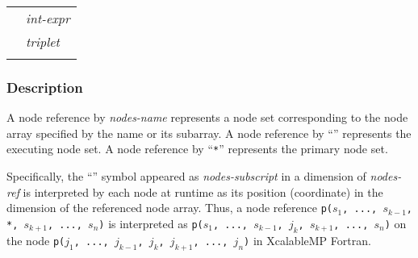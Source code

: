 \hspace{\hsize}

\begin{tabular}{ll}
 \hspace{0.5cm} & {\it int-expr} \\
 \hspace{0.5cm} & {\it triplet} \\
 \hspace{0.5cm} & {\tt *} \\
\end{tabular}


\subsubsection*{Description}


A node reference by {\it nodes-name} represents a node set corresponding
to the node array specified by the name or its subarray.
%
A node reference by ``{\tt *}''
represents the executing node set. A node reference by ``{\tt **}''
represents the primary node set.


Specifically, the ``{\tt *}'' symbol appeared as {\it nodes-subscript}
in a dimension of {\it nodes-ref} is interpreted by each node at runtime
as its position (coordinate) in the dimension of the referenced node
array.
%
Thus, a node reference {\tt p($s_1$, ..., $s_{k-1}$, *, $s_{k+1}$, ...,
$s_n$)} is interpreted as {\tt p($s_1$, ..., $s_{k-1}$, $j_k$,
$s_{k+1}$, ..., $s_n$)} on the node {\tt p($j_1$, ..., $j_{k-1}$, $j_k$,
$j_{k+1}$, ..., $j_n$)} in XcalableMP Fortran.

